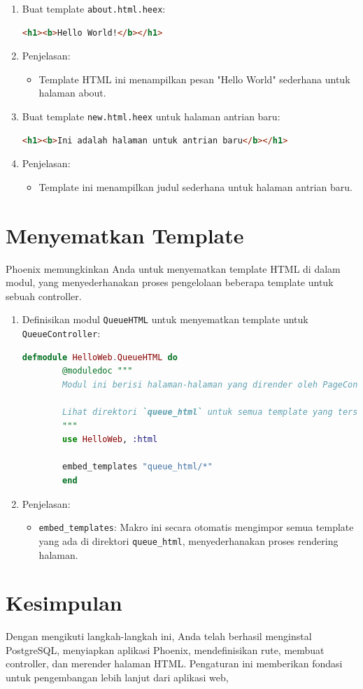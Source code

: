 \begin{enumerate}
	\item Buat template \texttt{about.html.heex}:
	\begin{lstlisting}[language=html]
		<h1><b>Hello World!</b></h1>
	\end{lstlisting}
	
	\item Penjelasan:
	\begin{itemize}
		\item Template HTML ini menampilkan pesan "Hello World" sederhana untuk halaman about.
	\end{itemize}
	
	\item Buat template \texttt{new.html.heex} untuk halaman antrian baru:
	\begin{lstlisting}[language=html]
		<h1><b>Ini adalah halaman untuk antrian baru</b></h1>
	\end{lstlisting}
	
	\item Penjelasan:
	\begin{itemize}
		\item Template ini menampilkan judul sederhana untuk halaman antrian baru.
	\end{itemize}
\end{enumerate}

\section{Menyematkan Template}
Phoenix memungkinkan Anda untuk menyematkan template HTML di dalam modul, yang menyederhanakan proses pengelolaan beberapa template untuk sebuah controller.

\begin{enumerate}
	\item Definisikan modul \texttt{QueueHTML} untuk menyematkan template untuk \texttt{QueueController}:
	\begin{lstlisting}[language=Elixir]
		defmodule HelloWeb.QueueHTML do
		@moduledoc """
		Modul ini berisi halaman-halaman yang dirender oleh PageController.
		
		Lihat direktori `queue_html` untuk semua template yang tersedia.
		"""
		use HelloWeb, :html
		
		embed_templates "queue_html/*"
		end
	\end{lstlisting}
	
	\item Penjelasan:
	\begin{itemize}
		\item \texttt{embed\_templates}: Makro ini secara otomatis mengimpor semua template yang ada di direktori \texttt{queue\_html}, menyederhanakan proses rendering halaman.
	\end{itemize}
\end{enumerate}

\section{Kesimpulan}
Dengan mengikuti langkah-langkah ini, Anda telah berhasil menginstal PostgreSQL, menyiapkan aplikasi Phoenix, mendefinisikan rute, membuat controller, dan merender halaman HTML. Pengaturan ini memberikan fondasi untuk pengembangan lebih lanjut dari aplikasi web,
